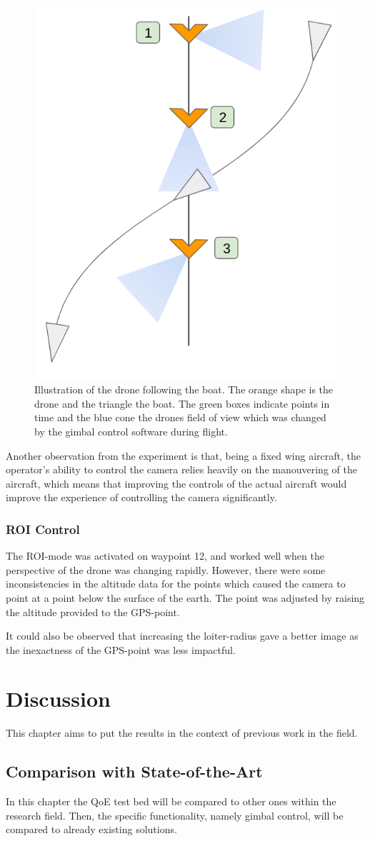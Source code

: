 \documentclass[nofilelist]{cslthse-msc}
\begin{document}
\begin{figure}[htp]
   \centering
   \includegraphics[width=.33\textwidth]{images/drone-boat-illustration.png}
   \caption{Illustration of the drone following the boat. The orange shape is the drone and the triangle the boat. The green boxes indicate points in time and the blue cone the drones field of view which was changed by the gimbal control software during flight.}
   \label{fig:boat-follow}
\end{figure}

Another observation from the experiment is that, being a fixed wing aircraft, the operator's ability to control the camera relies heavily on the manouvering of the aircraft, which means that improving the controls of the actual aircraft would improve the experience of controlling the camera significantly. 

\subsection{ROI Control}
The ROI-mode was activated on waypoint 12, and worked well when the perspective of the drone was changing rapidly. However, there were some inconsistencies in the altitude data for the points which caused the camera to point at a point below the surface of the earth. The point was adjusted by raising the altitude provided to the GPS-point. 

It could also be observed that increasing the loiter-radius gave a better image as the inexactness of the GPS-point was less impactful.


\chapter{Discussion}
This chapter aims to put the results in the context of previous work in the field.

\section{Comparison with State-of-the-Art}
In this chapter the QoE test bed will be compared to other ones within the research field. Then, the specific functionality, namely gimbal control, will be compared to already existing solutions.
\end{document}
